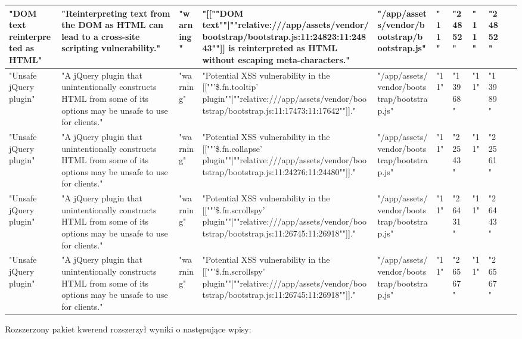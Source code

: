 \begin{table}[H]
\begin{tabular}{|l|l|l|l|l|l|l|l|l|l|}
      "DOM text reinterpreted as HTML" & "Reinterpreting text from the DOM as HTML can lead to a cross-site scripting vulnerability." & "warning" & "[[""DOM text""|""relative:///app/assets/vendor/bootstrap/bootstrap.js:11:24823:11:24843""]] is reinterpreted as HTML without escaping meta-characters." & "/app/assets/vendor/bootstrap/bootstrap.js" & "11" & "24852" & "11" & "24852" & ~ \\ \hline
      "Unsafe jQuery plugin" & "A jQuery plugin that unintentionally constructs HTML from some of its options may be unsafe to use for clients." & "warning" & "Potential XSS vulnerability in the [[""'\$.fn.tooltip' plugin""|""relative:///app/assets/vendor/bootstrap/bootstrap.js:11:17473:11:17642""]]." & "/app/assets/vendor/bootstrap/bootstrap.js" & "11" & "13968" & "11" & "13989" & ~ \\ \hline
      "Unsafe jQuery plugin" & "A jQuery plugin that unintentionally constructs HTML from some of its options may be unsafe to use for clients." & "warning" & "Potential XSS vulnerability in the [[""'\$.fn.collapse' plugin""|""relative:///app/assets/vendor/bootstrap/bootstrap.js:11:24276:11:24480""]]." & "/app/assets/vendor/bootstrap/bootstrap.js" & "11" & "22543" & "11" & "22561" & ~ \\ \hline
      "Unsafe jQuery plugin" & "A jQuery plugin that unintentionally constructs HTML from some of its options may be unsafe to use for clients." & "warning" & "Potential XSS vulnerability in the [[""'\$.fn.scrollspy' plugin""|""relative:///app/assets/vendor/bootstrap/bootstrap.js:11:26745:11:26918""]]." & "/app/assets/vendor/bootstrap/bootstrap.js" & "11" & "26431" & "11" & "26443" & ~ \\ \hline
      "Unsafe jQuery plugin" & "A jQuery plugin that unintentionally constructs HTML from some of its options may be unsafe to use for clients." & "warning" & "Potential XSS vulnerability in the [[""'\$.fn.scrollspy' plugin""|""relative:///app/assets/vendor/bootstrap/bootstrap.js:11:26745:11:26918""]]." & "/app/assets/vendor/bootstrap/bootstrap.js" & "11" & "26567" & "11" & "26567" & ~ \\ \hline
  \end{tabular}
\end{table}
Rozszerzony pakiet kwerend rozszerzył wyniki o następujące wpisy:

